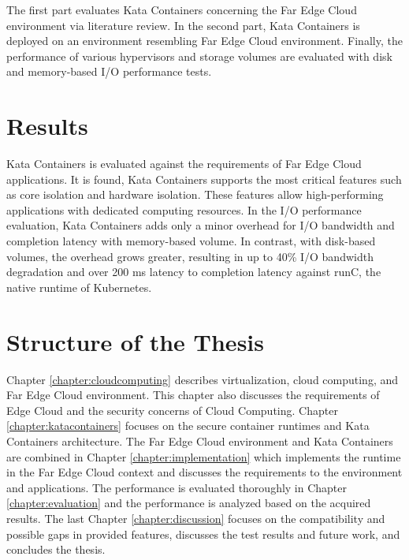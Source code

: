 The first part evaluates Kata Containers concerning the Far Edge Cloud environment via literature review. In the second part, Kata Containers is deployed on an environment resembling Far Edge Cloud environment. Finally, the performance of various hypervisors and storage volumes are evaluated with disk and memory-based I/O performance tests.

\section{Results}
\label{section:intro_results}

Kata Containers is evaluated against the requirements of Far Edge Cloud applications. It is found, Kata Containers supports the most critical features such as core isolation and hardware isolation. These features allow high-performing applications with dedicated computing resources. In the I/O performance evaluation, Kata Containers adds only a minor overhead for I/O bandwidth and completion latency with memory-based volume. In contrast, with disk-based volumes, the overhead grows greater, resulting in up to 40\% I/O bandwidth degradation and over 200 ms latency to completion latency against runC, the native runtime of Kubernetes.

\section{Structure of the Thesis}
\label{section:intro_structure}

Chapter \ref{chapter:cloudcomputing} describes virtualization, cloud computing, and Far Edge Cloud environment. This chapter also discusses the requirements of Edge Cloud and the security concerns of Cloud Computing. Chapter \ref{chapter:katacontainers} focuses on the secure container runtimes and Kata Containers architecture. The Far Edge Cloud environment and Kata Containers are combined in Chapter \ref{chapter:implementation} which implements the runtime in the Far Edge Cloud context and discusses the requirements to the environment and applications. The performance is evaluated thoroughly in Chapter \ref{chapter:evaluation} and the performance is analyzed based on the acquired results. The last Chapter \ref{chapter:discussion} focuses on the compatibility and possible gaps in provided features, discusses the test results and future work, and concludes the thesis.